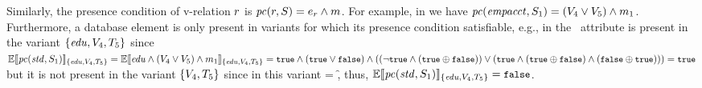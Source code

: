 Similarly, the presence condition of v-relation $\vRel$ is
\ensuremath{\getPCfrom \vRel \vSch = \dimMeta_\vRel \wedge \fModel}.
For example, in  we have
\ensuremath{\getPCfrom \empacct {\vSch_1} = (\vFour \vee \vFive) \wedge \fModel_1}.
%
Furthermore, a database element is only present in variants for
which its presence condition satisfiable, e.g., in 
 the \isstudent\ attribute 
is present in the variant 
\ensuremath{\setDef {\edu, \vFour, \tFive}} since 
\ensuremath{\fSem [\setDef {\edu, \vFour, \tFive}] {\getPCfrom \isstudent {\vSch_1}}
= \fSem [\setDef {\edu, \vFour, \tFive}] {\edu \wedge (\vFour \vee \vFive) \wedge \fModel_1}
= \t \wedge (\t \vee \f) \wedge ((\neg \t \wedge (\t \oplus \f)) \vee (\t \wedge (\t \oplus \f) \wedge (\f \oplus \t))) = \t}
but it is not present in the variant
\ensuremath{\setDef{\vFour, \tFive}} since in this variant \edu = \f, thus,
\ensuremath{\fSem [\setDef {\edu, \vFour, \tFive}] {\getPCfrom \isstudent {\vSch_1}} = \f}.


